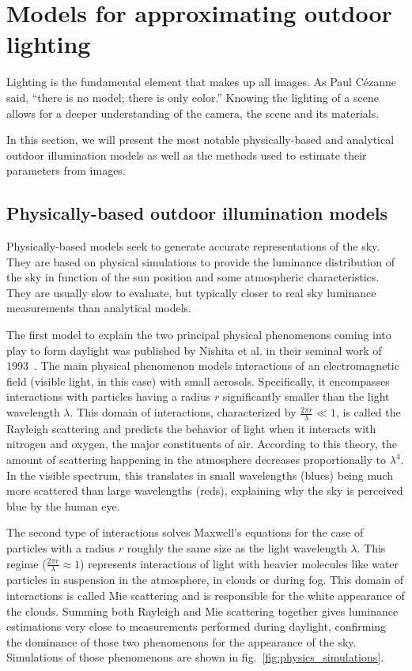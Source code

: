 

\section{Models for approximating outdoor lighting}

Lighting is the fundamental element that makes up all images. As Paul Cézanne said, ``there is no model; there is only color.'' Knowing the lighting of a scene allows for a deeper understanding of the camera, the scene and its materials.

In this section, we will present the most notable physically-based and analytical outdoor illumination models as well as the methods used to estimate their parameters from images.

\subsection{Physically-based outdoor illumination models}

Physically-based models seek to generate accurate representations of the sky. They are based on physical simulations to provide the luminance distribution of the sky in function of the sun position and some atmospheric characteristics. They are usually slow to evaluate, but typically closer to real sky luminance measurements than analytical models.

The first model to explain the two principal physical phenomenons coming into play to form daylight was published by Nishita et al. in their seminal work of 1993~\cite{nishita1993display}. The main physical phenomenon models interactions of an electromagnetic field (visible light, in this case) with small aerosols. Specifically, it encompasses interactions with particles having a radius $r$ significantly smaller than the light wavelength $\lambda$. This domain of interactions, characterized by $\frac{2\pi r}{\lambda} \ll 1$, is called the Rayleigh scattering and predicts the behavior of light when it interacts with nitrogen and oxygen, the major constituents of air. According to this theory, the amount of scattering happening in the atmosphere decreases proportionally to $\lambda^4$. In the visible spectrum, this translates in small wavelengths (blues) being much more scattered than large wavelengths (reds), explaining why the sky is perceived blue by the human eye.

The second type of interactions solves Maxwell's equations for the case of particles with a radius $r$ roughly the same size as the light wavelength $\lambda$. This regime ($\frac{2\pi r}{\lambda} \approx 1$) represents interactions of light with heavier molecules like water particles in suspension in the atmosphere, in clouds or during fog. This domain of interactions is called Mie scattering and is responsible for the white appearance of the clouds. Summing both Rayleigh and Mie scattering together gives luminance estimations very close to measurements performed during daylight, confirming the dominance of those two phenomenons for the appearance of the sky. Simulations of those phenomenons are shown in fig.~\ref{fig:physics_simulations}.

